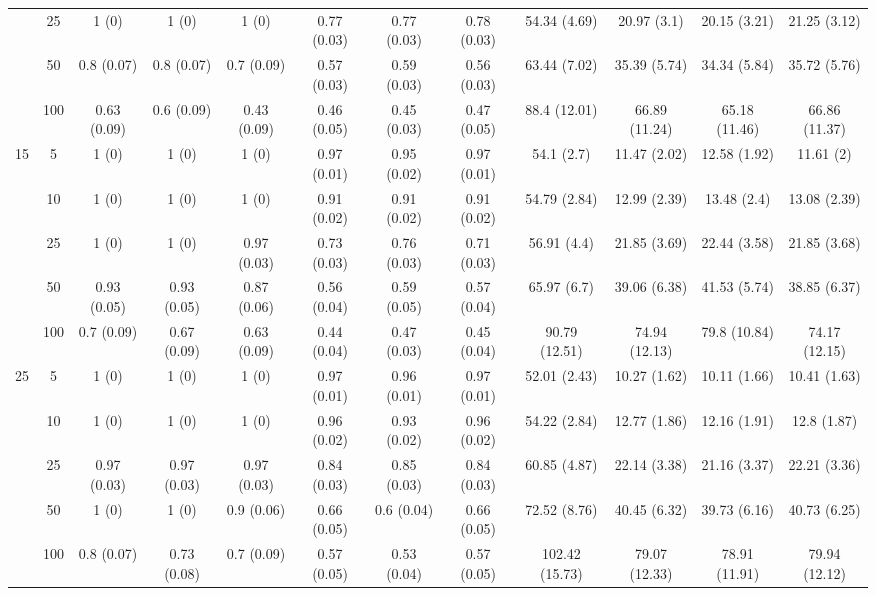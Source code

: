 \documentclass[10pt]{article}
\theoremstyle{definition}
\begin{document}
\begin{table}[H]
\begin{center}
{\begin{tabular}{cc|ccc|ccc|cccc|}
    & 25  & 1 (0) & 1 (0) & 1 (0) & 0.77 (0.03) & 0.77 (0.03) & 0.78 (0.03) & 54.34 (4.69) & 20.97 (3.1) & 20.15 (3.21) & 21.25 (3.12) \\ 
    & 50  & 0.8 (0.07) & 0.8 (0.07) & 0.7 (0.09) & 0.57 (0.03) & 0.59 (0.03) & 0.56 (0.03) & 63.44 (7.02) & 35.39 (5.74) & 34.34 (5.84) & 35.72 (5.76) \\ 
    & 100  & 0.63 (0.09) & 0.6 (0.09) & 0.43 (0.09) & 0.46 (0.05) & 0.45 (0.03) & 0.47 (0.05) & 88.4 (12.01) & 66.89 (11.24) & 65.18 (11.46) & 66.86 (11.37)\\[.3cm]
   \multirow{5}{*}{15}  & 5  & 1 (0) & 1 (0) & 1 (0) & 0.97 (0.01) & 0.95 (0.02) & 0.97 (0.01) & 54.1 (2.7) & 11.47 (2.02) & 12.58 (1.92) & 11.61 (2) \\ 
    & 10  & 1 (0) & 1 (0) & 1 (0) & 0.91 (0.02) & 0.91 (0.02) & 0.91 (0.02) & 54.79 (2.84) & 12.99 (2.39) & 13.48 (2.4) & 13.08 (2.39) \\ 
    & 25  & 1 (0) & 1 (0) & 0.97 (0.03) & 0.73 (0.03) & 0.76 (0.03) & 0.71 (0.03) & 56.91 (4.4) & 21.85 (3.69) & 22.44 (3.58) & 21.85 (3.68) \\ 
    & 50  & 0.93 (0.05) & 0.93 (0.05) & 0.87 (0.06) & 0.56 (0.04) & 0.59 (0.05) & 0.57 (0.04) & 65.97 (6.7) & 39.06 (6.38) & 41.53 (5.74) & 38.85 (6.37) \\ 
    & 100  & 0.7 (0.09) & 0.67 (0.09) & 0.63 (0.09) & 0.44 (0.04) & 0.47 (0.03) & 0.45 (0.04) & 90.79 (12.51) & 74.94 (12.13) & 79.8 (10.84) & 74.17 (12.15) \\[.3cm]
   \multirow{5}{*}{25}  & 5  & 1 (0) & 1 (0) & 1 (0) & 0.97 (0.01) & 0.96 (0.01) & 0.97 (0.01) & 52.01 (2.43) & 10.27 (1.62) & 10.11 (1.66) & 10.41 (1.63) \\ 
   & 10  & 1 (0) & 1 (0) & 1 (0) & 0.96 (0.02) & 0.93 (0.02) & 0.96 (0.02) & 54.22 (2.84) & 12.77 (1.86) & 12.16 (1.91) & 12.8 (1.87) \\ 
    & 25  & 0.97 (0.03) & 0.97 (0.03) & 0.97 (0.03) & 0.84 (0.03) & 0.85 (0.03) & 0.84 (0.03) & 60.85 (4.87) & 22.14 (3.38) & 21.16 (3.37) & 22.21 (3.36) \\ 
    & 50  & 1 (0) & 1 (0) & 0.9 (0.06) & 0.66 (0.05) & 0.6 (0.04) & 0.66 (0.05) & 72.52 (8.76) & 40.45 (6.32) & 39.73 (6.16) & 40.73 (6.25) \\ 
    & 100  & 0.8 (0.07) & 0.73 (0.08) & 0.7 (0.09) & 0.57 (0.05) & 0.53 (0.04) & 0.57 (0.05) & 102.42 (15.73) & 79.07 (12.33) & 78.91 (11.91) & 79.94 (12.12) \\ 
\end{tabular}}
   \end{center}
      \vspace{-.5cm}
\end{table}
\end{document}
